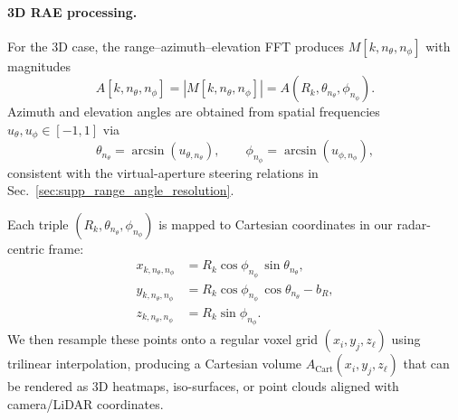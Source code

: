 \paragraph{3D RAE processing.}
For the 3D case, the range--azimuth--elevation FFT produces $M[k,n_\theta,n_\phi]$ with magnitudes
\[
    A[k,n_\theta,n_\phi] = |M[k,n_\theta,n_\phi]|
    = A(R_k,\theta_{n_\theta},\phi_{n_\phi}).
\]
Azimuth and elevation angles are obtained from spatial frequencies $u_\theta,u_\phi \in [-1,1]$ via
\[
    \theta_{n_\theta} = \arcsin(u_{\theta,n_\theta}), \qquad
    \phi_{n_\phi} = \arcsin(u_{\phi,n_\phi}),
\]
consistent with the virtual-aperture steering relations in Sec.~\ref{sec:supp_range_angle_resolution}.

Each triple $(R_k,\theta_{n_\theta},\phi_{n_\phi})$ is mapped to Cartesian coordinates in our radar-centric frame:
\[
\begin{aligned}
    x_{k,n_\theta,n_\phi} &= R_k \cos\phi_{n_\phi}\,\sin\theta_{n_\theta}, \\
    y_{k,n_\theta,n_\phi} &= R_k \cos\phi_{n_\phi}\,\cos\theta_{n_\theta} - b_R, \\
    z_{k,n_\theta,n_\phi} &= R_k \sin\phi_{n_\phi}.
\end{aligned}
\]
We then resample these points onto a regular voxel grid $(x_i,y_j,z_\ell)$ using trilinear interpolation, producing a Cartesian volume $A_\text{Cart}(x_i,y_j,z_\ell)$ that can be rendered as 3D heatmaps, iso-surfaces, or point clouds aligned with camera/LiDAR coordinates.